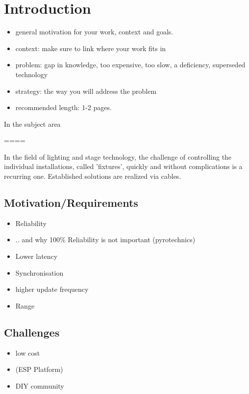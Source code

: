 \documentclass[]{ccs-thesis}
\begin{document}
\cleardoublepage
\tableofcontents
{}

\cleardoublepage
{}



\chapter{Introduction}

\begin{itemize}
\item general motivation for your work, context and goals.
\item context: make sure to link where your work fits in
\item problem: gap in knowledge, too expensive, too slow, a deficiency, superseded technology
\item strategy: the way you will address the problem
\item recommended length: 1-2 pages.
\end{itemize}

In the subject area 

====

In the field of lighting and stage technology, the challenge of controlling the individual installations, called 'fixtures', quickly and without complications is a recurring one. 
Established solutions are realized via cables.

\section*{Motivation/Requirements}
\begin{itemize}
\item Reliability
\item .. and why 100\% Reliability is not important (pyrotechnics)
\item Lower latency
\item Synchronisation
\item higher update frequency
\item Range
\end{itemize}

\section*{Challenges}
\begin{itemize}
\item low cost
\item (ESP Platform)
\item DIY community
\end{itemize}
\end{document}
